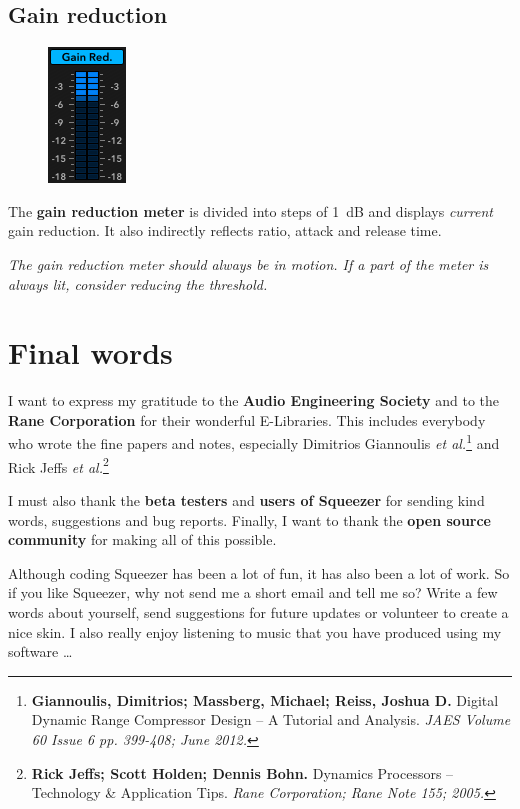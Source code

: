 \section{Gain reduction}

\begin{figure}
\includegraphics[scale=0.58,clip]{include/images/meter_gain_reduction.png}
\end{figure}

The \textbf{gain reduction meter} is divided into steps of \SI{1}{\dB}
and displays \emph{current} gain reduction.  It also indirectly
reflects ratio, attack and release time.

\emph{The gain reduction meter should always be in motion.  If a part
  of the meter is always lit, consider reducing the threshold.}

\chapter{Final words}
\label{chap:final_words}

I want to express my gratitude to the \textbf{Audio Engineering
  Society} and to the \textbf{Rane Corporation} for their wonderful
E-Libraries.  This includes everybody who wrote the fine papers and
notes, especially Dimitrios Giannoulis \emph{et
  al.}\footnote{\textbf{Giannoulis, Dimitrios; Massberg, Michael;
    Reiss, Joshua D.}  Digital Dynamic Range Compressor Design -- A
  Tutorial and Analysis. \emph{JAES Volume 60 Issue 6 pp. 399-408;
    June 2012.}} and Rick Jeffs \emph{et al.}\footnote{\textbf{Rick
    Jeffs; Scott Holden; Dennis Bohn.}  Dynamics Processors --
  Technology \& Application Tips.  \emph{Rane Corporation; Rane Note
    155; 2005.}}

I must also thank the \textbf{beta testers} and \textbf{users of
  Squeezer} for sending kind words, suggestions and bug reports.
Finally, I want to thank the \textbf{open source community} for making
all of this possible.

Although coding Squeezer has been a lot of fun, it has also been a lot
of work.  So if you like Squeezer, why not send me a short email and
tell me so?  Write a few words about yourself, send suggestions for
future updates or volunteer to create a nice skin.  I also really
enjoy listening to music that you have produced using my software
\dots

